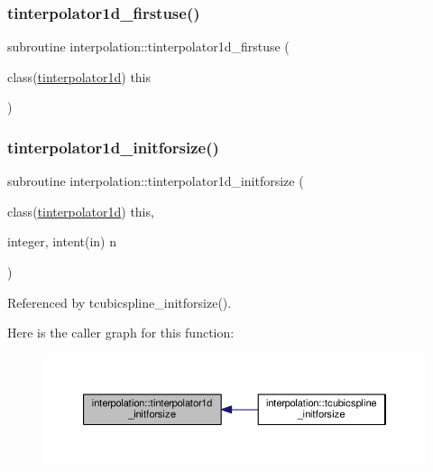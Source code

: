 \subsubsection{\texorpdfstring{tinterpolator1d\+\_\+firstuse()}{tinterpolator1d\_firstuse()}}
{\footnotesize\ttfamily subroutine interpolation\+::tinterpolator1d\+\_\+firstuse (\begin{DoxyParamCaption}\item[{class(\mbox{\hyperlink{structinterpolation_1_1tinterpolator1d}{tinterpolator1d}})}]{this }\end{DoxyParamCaption})}

\mbox{\label{namespaceinterpolation_a9c0d111d38654ca08fd15e627d8f8ad3}} 
\subsubsection{\texorpdfstring{tinterpolator1d\+\_\+initforsize()}{tinterpolator1d\_initforsize()}}
{\footnotesize\ttfamily subroutine interpolation\+::tinterpolator1d\+\_\+initforsize (\begin{DoxyParamCaption}\item[{class(\mbox{\hyperlink{structinterpolation_1_1tinterpolator1d}{tinterpolator1d}})}]{this,  }\item[{integer, intent(in)}]{n }\end{DoxyParamCaption})}



Referenced by tcubicspline\+\_\+initforsize().

Here is the caller graph for this function\+:
\nopagebreak
\begin{figure}[H]
\begin{center}
\leavevmode
\includegraphics[width=350pt]{namespaceinterpolation_a9c0d111d38654ca08fd15e627d8f8ad3_icgraph}
\end{center}
\end{figure}
\mbox{\label{namespaceinterpolation_ab07350cec2d065eb2972b8dcabc45545}} 
